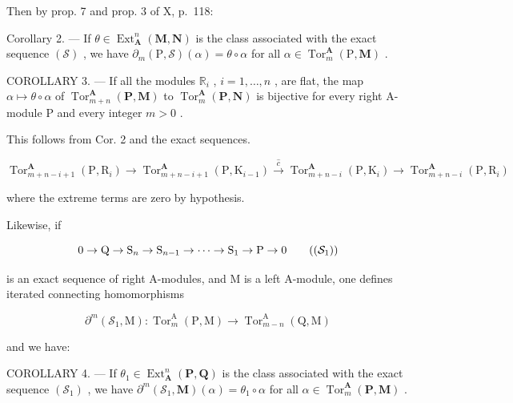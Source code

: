 Then by prop. 7 and prop. 3 of X, p.~118:

Corollary 2. --- If \(\theta \in \operatorname{Ext}_{\mathbf{A}}^{n}(\mathbf{M}, \mathbf{N})\) is the class associated with the exact sequence \((\mathcal{S})\) , we have \(\partial_{m}(\mathrm{P}, \mathcal{S})(\alpha) = \theta \circ \alpha\) for all \(\alpha \in \operatorname{Tor}_{m}^{\mathbf{A}}(\mathrm{P}, \mathbf{M})\) .

COROLLARY 3. --- If all the modules \(\mathbb{R}_i\) , \(i = 1, \ldots, n\) , are flat, the map \(\alpha \mapsto \theta \circ \alpha\) of \(\operatorname{Tor}_{m+n}^{\mathbf{A}}(\mathbf{P}, \mathbf{M})\) to \(\operatorname{Tor}_m^{\mathbf{A}}(\mathbf{P}, \mathbf{N})\) is bijective for every right A-module P and every integer \(m > 0\) .

This follows from Cor. 2 and the exact sequences.

\[
\operatorname{Tor} _ {m + n - i + 1} ^ {\mathbf {A}} \left(\mathrm{P}, \mathrm{R} _ {i}\right)\rightarrow \operatorname{Tor} _ {m + n - i + 1} ^ {\mathbf {A}} \left(\mathrm{P}, \mathrm{K} _ {i - 1}\right) \xrightarrow {\hat {c}} \operatorname{Tor} _ {m + n - i} ^ {\mathbf {A}} \left(\mathrm{P}, \mathrm{K} _ {i}\right)\rightarrow \operatorname{Tor} _ {m + n - i} ^ {\mathbf {A}} \left(\mathrm{P}, \mathrm{R} _ {i}\right)
\]

where the extreme terms are zero by hypothesis.

Likewise, if

\[
0 \rightarrow \mathrm{Q} \rightarrow \mathrm{S} _ {n} \rightarrow \mathrm{S} _ {n - 1} \rightarrow \dots \rightarrow \mathrm{S} _ {1} \rightarrow \mathrm{P} \rightarrow 0\tag{$(\mathcal{S}_1)$}
\]

is an exact sequence of right A-modules, and M is a left A-module, one defines iterated connecting homomorphisms

\[
\partial^ {m} (\mathcal {S} _ {1}, \mathrm{M}): \operatorname{Tor} _ {m} ^ {\mathrm{A}} (\mathrm{P}, \mathrm{M}) \rightarrow \operatorname{Tor} _ {m - n} ^ {\mathrm{A}} (\mathrm{Q}, \mathrm{M})
\]

and we have:

COROLLARY 4. --- If \(\theta_{1} \in \operatorname{Ext}_{\mathbf{A}}^{n}(\mathbf{P}, \mathbf{Q})\) is the class associated with the exact sequence \((\mathcal{S}_{1})\) , we have \(\partial^{m}(\mathcal{S}_{1}, \mathbf{M})(\alpha) = \theta_{1} \circ \alpha\) for all \(\alpha \in \operatorname{Tor}_{m}^{\mathbf{A}}(\mathbf{P}, \mathbf{M})\) .

